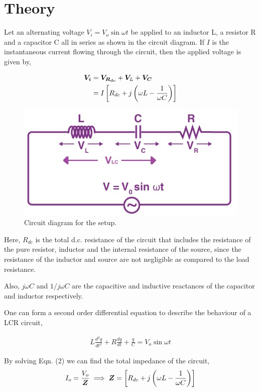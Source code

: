 \section{Theory}
Let an alternating voltage $V_i = V_o \sin \omega t$ be applied to an inductor L, a resistor R and a capacitor C all in
series as shown in the circuit diagram. If $I$ is the instantaneous current flowing through the
circuit, then the applied voltage is given by,

\begin{align}
    \boldsymbol{V_i} &= \boldsymbol{V_{R_{dc}}} + \boldsymbol{V_}L + \boldsymbol{V_C} \nonumber \\
    &=I \left[R_{dc} + j\left(\omega L-\frac{1}{\omega C}\right)\right]
\end{align}

\begin{figure}[H]
    \centering
    \includegraphics[width=0.7\columnwidth]{images/f1.jpg}
    \caption{Circuit diagram for the setup.}
    \label{fig:1}
\end{figure}

Here, $R_{dc}$ is the total d.c. resistance of the circuit that includes the resistance of the pure resistor, inductor and the internal resistance of the source, since the resistance of the inductor and source are not negligible as compared to the load resistance.

Also, $j\omega C$ and $1/j\omega C$ are the capacitive and inductive reactances of the capacitor and inductor respectively.

One can form a second order differential equation to describe the behaviour of a LCR circuit,

\begin{align}
    L\frac{d^2q}{dt^2}+R\frac{dq}{dt}+\frac{q}{C}=V_o\sin\omega t
\end{align}

By solving Eqn. (2) we can find the total impedance of the circuit,
\begin{align}
    I_o=\frac{V_o}{\boldsymbol{Z}}\implies\boldsymbol{Z} = \left[R_{dc} + j\left(\omega L-\frac{1}{\omega C}\right)\right]
\end{align}

